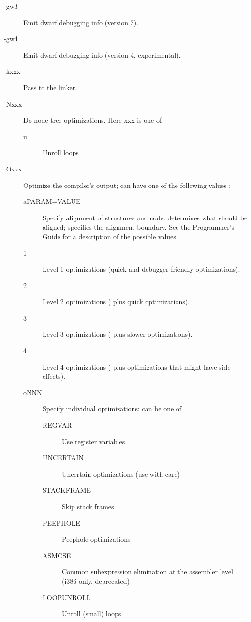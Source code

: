 \begin{description}
\item [-gw3] Emit dwarf debugging info (version 3).
\item [-gw4] Emit dwarf debugging info (version 4, experimental).
\item[-kxxx] Pass  to the linker.
\item[-Nxxx] Do node tree optimizations. Here xxx is one of
\begin{description}
\item[u] Unroll loops
\end{description}
\item[-Oxxx]  Optimize the compiler's output;  can have one
of the following values :
\begin{description}
\item[aPARAM=VALUE] Specify alignment of structures and code. 
determines what should be aligned;  specifies the alignment
boundary. See the Programmer's Guide for a description of the possible
values.
\item[1] Level 1 optimizations (quick and debugger-friendly optimizations).
\item[2] Level 2 optimizations ( plus quick optimizations).
\item[3] Level 3 optimizations ( plus slower optimizations).
\item[4] Level 4 optimizations ( plus optimizations that might have side effects).
\item[oNNN] Specify individual optimizations:  can be one of
\begin{description}
\item[REGVAR] Use register variables
\item[UNCERTAIN] Uncertain optimizations (use with care)
\item[STACKFRAME] Skip stack frames
\item[PEEPHOLE] Peephole optimizations
\item[ASMCSE] Common subexpression elimination at the assembler level (i386-only, deprecated)
\item[LOOPUNROLL] Unroll (small) loops

\end{description}
\end{description}
\end{description}
